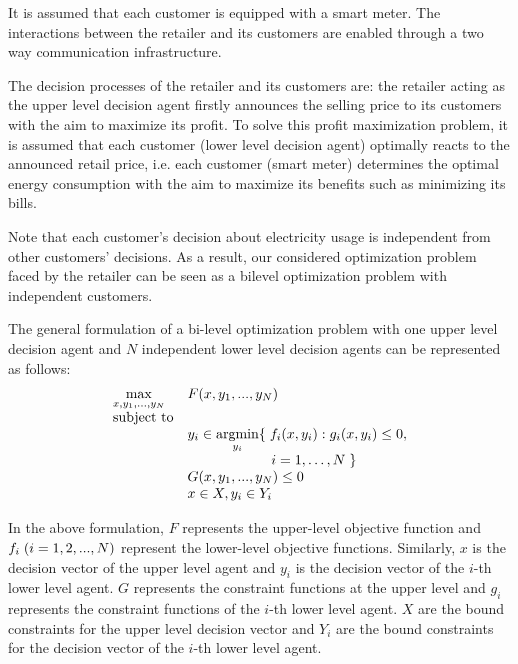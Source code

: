 \documentclass[10pt,journal]{IEEEtran}
\theoremstyle{definition}
\theoremstyle{plain} \newtheorem{theo}{Theorem} \newtheorem{prop}{Proposition}  \newtheorem{lemm}{Lemma}
\begin{document}
It is assumed that each customer is equipped with a smart meter. The interactions between the retailer and its customers are enabled through a two way communication infrastructure. 



The decision processes of the retailer and its customers are: the retailer acting as the upper level decision agent firstly announces the selling price to its customers with the aim to maximize its profit. To solve this profit maximization problem, it is assumed that each customer (lower level decision agent) optimally reacts to the announced retail price, i.e. each customer (smart meter) determines the optimal energy consumption with the aim to maximize its benefits such as minimizing its bills.



Note that each customer's decision about electricity usage is independent from other customers' decisions. As a result, our considered optimization problem faced by the retailer can be seen as a bilevel optimization problem with independent customers.





The general formulation of a bi-level optimization problem with one upper level decision agent and $N$ independent lower level decision agents can be represented as follows: 
\begin{equation}  \label{bilevel_formualtion}
\begin{array}{ll} 
\max \limits_{x,y_{1},...,y_N}& F(x,y_{1},...,y_N) \\ 
\hbox{subject to} & \\ 
& y_i \in \underset{y_i}{\operatorname{argmin}} \lbrace \hspace{1mm} f_i(x,y_i):g_i(x,y_i)\leq 0, \\
& \quad \quad \quad \quad \quad \quad i=1,\dots,N \hspace{1mm} \rbrace\\ & G(x,y_{1},...,y_N)\leq 0 \\
 & x\in X, y_i\in Y_i 
\end{array}
\end{equation}




In the above formulation, $F$ represents the upper-level objective function and $f_i \hspace{0.1cm}   (i=1,2,...,N)$ represent the lower-level objective functions. Similarly, $x$ is the decision vector of the upper level agent and $y_i$ is the decision vector of the $i$-th lower level agent. $G$ represents the constraint functions at the upper level and $g_i$ represents the constraint functions of the $i$-th lower level agent.  $X$ are the bound constraints for the upper level decision vector and $Y_i$ are the bound constraints for the decision vector of the $i$-th lower level agent.
\end{document}
